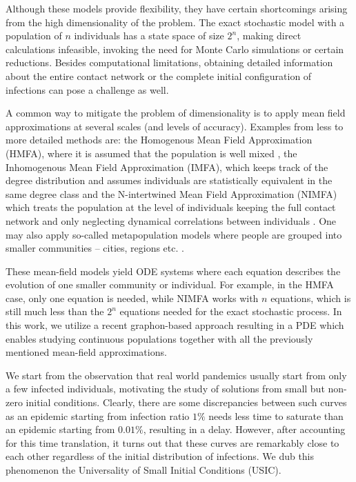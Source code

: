 \documentclass{article}
\newcommand{\1}[1]{{\mathds{1}}_{\left\{#1\right\}}}
\begin{document}
Although these models provide flexibility, they have certain shortcomings arising from the high dimensionality of the problem. The exact stochastic model with a population of $n$ individuals has a state space of size $2^n$, making direct calculations infeasible, invoking the need for Monte Carlo simulations or certain reductions. Besides computational limitations, obtaining detailed information about the entire contact network or the complete initial configuration of infections can pose a challenge as well. 

A common way to mitigate the problem of dimensionality is to apply mean field approximations at several scales (and levels of accuracy). Examples from less to more detailed methods are: the Homogenous Mean Field Approximation (HMFA), where it is assumed that the population is well mixed \cite{kurtz70}, the Inhomogenous Mean Field Approximation (IMFA), which keeps track of the degree distribution and assumes individuals are statistically equivalent in the same degree class \cite{vesp} and the N-intertwined Mean Field Approximation (NIMFA) which treats the population at the level of individuals keeping the full contact network and only neglecting dynamical correlations between individuals \cite{NIMFA2011}. One may also apply so-called metapopulation models where people are grouped into smaller communities -- cities, regions etc. \cite{SIS_metapopulation}.

These mean-field models yield ODE systems where each equation describes the evolution of one smaller community or individual. For example, in the HMFA case, only one equation is needed, while NIMFA works with $n$ equations, which is still much less than the $2^n$ equations needed for the exact stochastic process. In this work, we utilize a recent graphon-based approach resulting in a PDE \cite{graphonSISnoise, graphonSIScontrol} which enables studying continuous populations together with all the previously mentioned mean-field approximations.

We start from the observation that real world pandemics usually start from only a few infected individuals, motivating the study of solutions from small but non-zero initial conditions. Clearly, there are some discrepancies between such curves as an epidemic starting from infection ratio $1 \%$ needs less time to saturate than an epidemic starting from $0.01 \%$, resulting in a delay. However, after accounting for this time translation, it turns out that these curves are remarkably close to each other regardless of the initial distribution of infections. We dub this phenomenon the Universality of Small Initial Conditions (USIC).
\end{document}
